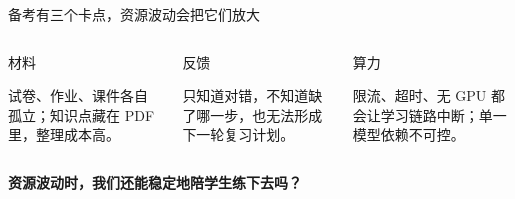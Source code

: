 \documentclass[aspectratio=169,11pt]{beamer}
\newcommand{\labeltext}[1]{{\scriptsize\color{slateMuted}\MakeUppercase{#1}}}
\begin{document}
\begin{frame}{备考有三个卡点，资源波动会把它们放大}
  \vspace{2mm}
  \begin{columns}[T]
    \begin{tcolorbox}[card]
      \labeltext{材料}\par\vspace{2mm}{\large\bfseries 材料多，题目散}\par\vspace{2mm}
      \small 试卷、作业、课件各自孤立；知识点藏在 PDF 里，整理成本高。
    \end{tcolorbox}
    \begin{tcolorbox}[card]
      \labeltext{反馈}\par\vspace{2mm}{\large\bfseries 刷题多，反馈浅}\par\vspace{2mm}
      \small 只知道对错，不知道缺了哪一步，也无法形成下一轮复习计划。
    \end{tcolorbox}
    \begin{tcolorbox}[accent]
      \labeltext{算力}\par\vspace{2mm}{\large\bfseries 模型好，未必稳}\par\vspace{2mm}
      \small 限流、超时、无 GPU 都会让学习链路中断；单一模型依赖不可控。
    \end{tcolorbox}
  \end{columns}
  \vspace{5mm}\begin{center}\large\bfseries
    资源波动时，我们还能稳定地陪学生练下去吗？
  \end{center}
\end{frame}
\end{document}
